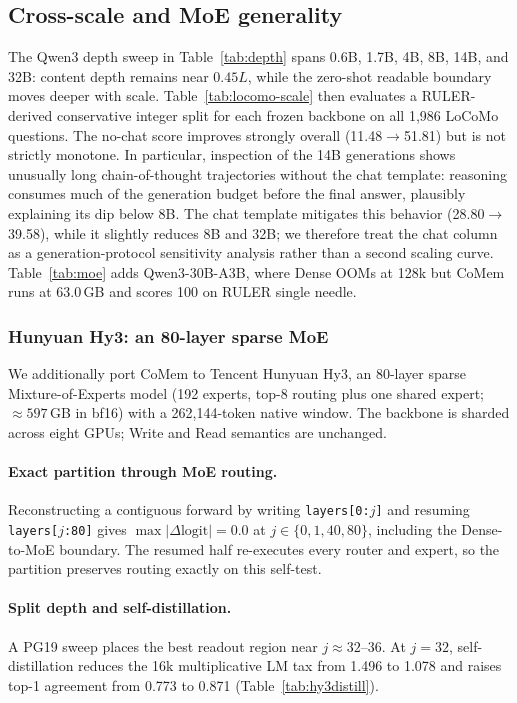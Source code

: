\subsection{Cross-scale and MoE generality}
\label{app:generality}
The Qwen3 depth sweep in Table~\ref{tab:depth} spans 0.6B, 1.7B, 4B, 8B, 14B,
and 32B: content depth remains near $0.45L$, while the zero-shot readable
boundary moves deeper with scale. Table~\ref{tab:locomo-scale} then evaluates a
RULER-derived conservative integer split for each frozen backbone on all 1,986
LoCoMo questions. The no-chat score improves strongly overall
(11.48$\to$51.81) but is not strictly monotone. In particular, inspection of the
14B generations shows unusually long chain-of-thought trajectories without the
chat template: reasoning consumes much of the generation budget before the final
answer, plausibly explaining its dip below 8B. The chat template mitigates this
behavior (28.80$\to$39.58), while it slightly reduces 8B and 32B; we therefore
treat the chat column as a generation-protocol sensitivity analysis rather than
a second scaling curve. Table~\ref{tab:moe} adds Qwen3-30B-A3B, where Dense OOMs at 128k but
CoMem runs at 63.0\,GB and scores 100 on RULER single needle.




\subsubsection{Hunyuan Hy3: an 80-layer sparse MoE}
\label{sec:hy3-general}
We additionally port CoMem to Tencent Hunyuan Hy3, an 80-layer sparse
Mixture-of-Experts model (192 experts, top-8 routing plus one shared expert;
$\approx597$\,GB in bf16) with a 262,144-token native window. The backbone is
sharded across eight GPUs; Write and Read semantics are unchanged.

\paragraph{Exact partition through MoE routing.}
Reconstructing a contiguous forward by writing \texttt{layers[0:$j$]} and
resuming \texttt{layers[$j$:80]} gives
$\max|\Delta\mathrm{logit}|=0.0$ at $j\in\{0,1,40,80\}$, including the
Dense-to-MoE boundary. The resumed half re-executes every router and expert, so
the partition preserves routing exactly on this self-test.

\paragraph{Split depth and self-distillation.}
A PG19 sweep places the best readout region near $j\approx32$--36. At $j=32$,
self-distillation reduces the 16k multiplicative LM tax from 1.496 to 1.078 and
raises top-1 agreement from 0.773 to 0.871
(Table~\ref{tab:hy3distill}).

